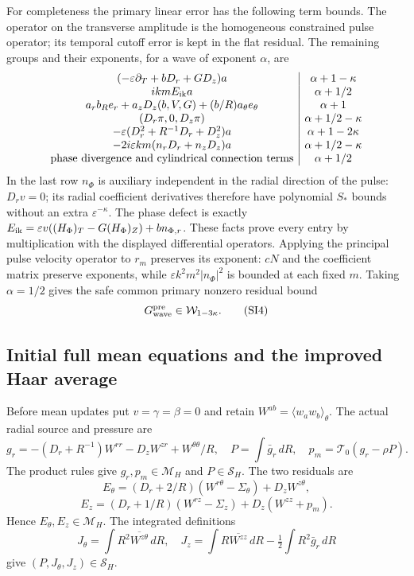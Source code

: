 \documentclass[10pt,a4paper]{article}
\begin{document}
For completeness the primary linear error has the following term bounds.
The operator on the transverse amplitude is the homogeneous constrained pulse
operator; its temporal cutoff error is kept in the flat residual.  The
remaining groups and their exponents, for a wave of exponent $\alpha$, are
\[
\begin{array}{c|c}
(-\varepsilon\partial_T+bD_r+GD_z)a&\alpha+1-\kappa\\
ikmE_{\rm ik}a&\alpha+1/2\\
a_r b_R e_r+a_zD_z(b,V,G)+(b/R)a_\theta e_\theta&\alpha+1\\
(D_r\pi,0,D_z\pi)&\alpha+1/2-\kappa\\
-\varepsilon(D_r^2+R^{-1}D_r+D_z^2)a&\alpha+1-2\kappa\\
-2i\varepsilon km(n_rD_r+n_zD_z)a&\alpha+1/2-\kappa\\
\text{phase divergence and cylindrical connection terms}&\alpha+1/2
\end{array}
\]
In the last row $n_\Phi$ is auxiliary independent in the radial direction
of the pulse: $D_rv=0$; its radial coefficient derivatives therefore have
polynomial $S_*$ bounds without an extra $\varepsilon^{-\kappa}$.
The phase defect is exactly
$E_{\rm ik}=\varepsilon v((H_\Phi)_T-G(H_\Phi)_Z)+bn_{\Phi,r}$.
These facts prove every entry by multiplication with the displayed differential
operators.  Applying the principal pulse velocity operator to $r_m$ preserves
its exponent: $cN$ and the coefficient matrix preserve exponents, while
$\varepsilon k^2m^2|n_\Phi|^2$ is bounded at each fixed $m$.
Taking $\alpha=1/2$ gives the safe common primary nonzero residual bound
\[
G_{\rm wave}^{\rm pre}\in\mathcal W_{1-3\kappa}.
\tag{SI4}
\]

\subsection{Initial full mean equations and the improved Haar average}

Before mean updates put $v=\gamma=\beta=0$ and retain
$W^{ab}=\langle w_aw_b\rangle_\theta$.  The actual radial source and
pressure are
\[
g_r=-(D_r+R^{-1})W^{rr}-D_zW^{zr}+W^{\theta\theta}/R,
\quad P=\int\bar g_r\,dR,\quad p_m=\mathcal T_0(g_r-\rho P).
\]
The product rules give $g_r,p_m\in\mathcal M_H$ and
$P\in\mathcal S_H$.  The two residuals are
\[
E_\theta=(D_r+2/R)(W^{r\theta}-\Sigma_\theta)+D_zW^{z\theta},
\]
\[
E_z=(D_r+1/R)(W^{rz}-\Sigma_z)+D_z(W^{zz}+p_m).
\tag{SI5}
\]
Hence $E_\theta,E_z\in\mathcal M_H$.  The integrated definitions
\[
J_\theta=\int R^2\overline{W^{z\theta}}\,dR,\quad
J_z=\int R\overline{W^{zz}}\,dR-\tfrac12\int R^2\bar g_r\,dR
\]
give $(P,J_\theta,J_z)\in\mathcal S_H$.
\end{document}
